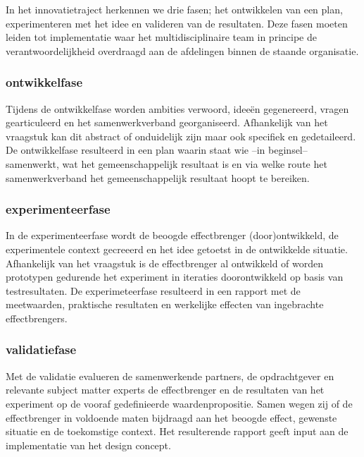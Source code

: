 \documentclass[
]{book}
\begin{document}
In het innovatietraject herkennen we drie fasen; het ontwikkelen van een plan, experimenteren met het idee en valideren van de resultaten. Deze fasen moeten leiden tot implementatie waar het multidisciplinaire team in principe de verantwoordelijkheid overdraagd aan de afdelingen binnen de staande organisatie.

\hypertarget{ontwikkelfase}{%
\subsubsection{ontwikkelfase}\label{ontwikkelfase}}

Tijdens de ontwikkelfase worden ambities verwoord, ideeën gegenereerd, vragen gearticuleerd en het samenwerkverband georganiseerd. Afhankelijk van het vraagstuk kan dit abstract of onduidelijk zijn maar ook specifiek en gedetaileerd. De ontwikkelfase resulteerd in een plan waarin staat wie --in beginsel-- samenwerkt, wat het gemeenschappelijk resultaat is en via welke route het samenwerkverband het gemeenschappelijk resultaat hoopt te bereiken.

\hypertarget{experimenteerfase}{%
\subsubsection{experimenteerfase}\label{experimenteerfase}}

In de experimenteerfase wordt de beoogde effectbrenger (door)ontwikkeld, de experimentele context gecreeerd en het idee getoetst in de ontwikkelde situatie. Afhankelijk van het vraagstuk is de effectbrenger al ontwikkeld of worden prototypen gedurende het experiment in iteraties doorontwikkeld op basis van testresultaten. De experimeteerfase resulteerd in een rapport met de meetwaarden, praktische resultaten en werkelijke effecten van ingebrachte effectbrengers.

\hypertarget{validatiefase}{%
\subsubsection{validatiefase}\label{validatiefase}}

Met de validatie evalueren de samenwerkende partners, de opdrachtgever en relevante subject matter experts de effectbrenger en de resultaten van het experiment op de vooraf gedefinieerde waardenpropositie. Samen wegen zij of de effectbrenger in voldoende maten bijdraagd aan het beoogde effect, gewenste situatie en de toekomstige context. Het resulterende rapport geeft input aan de implementatie van het design concept.
\end{document}
